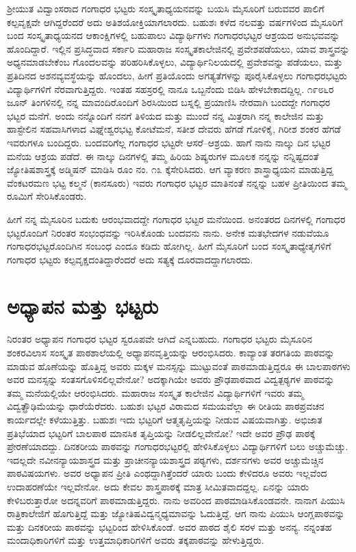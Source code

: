 {ಶ್ರೀಯುತ ವಿದ್ವಾಂಸರಾದ ಗಂಗಾಧರ ಭಟ್ಟರು ಸಂಸ್ಕೃತಾಧ್ಯಯನವನ್ನು ಬಯಸಿ ಮೈಸೂರಿಗೆ ಬರುವವರ ಪಾಲಿಗೆ ಕಲ್ಪವೃಕ್ಷವೇ ಆಗಿದ್ದರೆಂದರೆ ಅದು ಅತಿಶಯೋಕ್ತಿಯಾಗಲಾರದು. ಬಹುಶಃ ಕಳೆದ ನಲವತ್ತು ವರ್ಷಗಳಿಂದ ಮೈಸೂರಿಗೆ ಬಂದ ಸಂಸ್ಕೃತಾಧ್ಯಯನದ ಆಕಾಂಕ್ಷಿಗಳಲ್ಲಿ ಬಹುಪಾಲು ವಿದ್ಯಾರ್ಥಿಗಳು ಗಂಗಾಧರಭಟ್ಟರ ಆಶ್ರಯದ ಅನುಭವವನ್ನು ಹೊಂದಿದ್ದಾರೆ. ಇಲ್ಲಿನ ಪ್ರಸಿದ್ಧವಾದ ಸರ್ಕಾರಿ ಮಹಾರಾಜ ಸಂಸ್ಕೃತಕಾಲೇಜಿನಲ್ಲಿ ಪ್ರವೇಶಪಡೆಯಲು, ಯಾವ ಶಾಸ್ತ್ರವನ್ನು ಅಧ್ಯನಮಾಡಬೇಕೆಂಬ ಗೊಂದಲವನ್ನು ಪರಿಹರಿಸಿಕೊಳ್ಳಲು, ವಿದ್ಯಾರ್ಥಿನಿಲಯದಲ್ಲಿ ಪ್ರವೇಶವನ್ನು ಪಡೆಯಲು, ಮತ್ತು ಪ್ರತಿದಿನದ ಅಶನವ್ಯವಸ್ಥೆಯನ್ನು ಹೊಂದಲು, ಹೀಗೆ ಪ್ರತಿಯೊಂದು ಅಗತ್ಯತೆಗಳನ್ನು ಪೂರೈಸಿಕೊಳ್ಳಲು ಗಂಗಾಧರಭಟ್ಟರು ವಿದ್ಯಾರ್ಥಿಗಳಿಗೆ ನೆರವಾಗುತ್ತಿದ್ದರು. ಇಂತಹ ಸಹಸ್ರರಲ್ಲಿ ನಾನೂ ಒಬ್ಬನೆಂದು ಬಿಡಿಸಿ ಹೇಳಬೇಕಾದದ್ದಿಲ್ಲ. ೧೯೮೬ರ ಜೂನ್ ತಿಂಗಳಿನಲ್ಲಿ ನನ್ನ ಮಾವಂದಿರೊಂದಿಗೆ ಶಿರಸಿಯಿಂದ ಬಸ್ನಲ್ಲಿ ಪ್ರಯಾಣಿಸಿ ನೇರವಾಗಿ ಬಂದದ್ದೇ ಗಂಗಾಧರ ಭಟ್ಟರ ಮನೆಗೆ. ಅಂದು ನನ್ನೊಂದಿಗೆ ನನಗೆ ತಿಳಿಯದ ಮತ್ತು ಮುಂದೆ ನನ್ನ ಮಿತ್ರರಾಗಿ ನನ್ನ ಕಾಲೇಜಿನ ಮತ್ತು ಹಾಸ್ಟೇಲಿನ ಸಹವಾಸಿಗಳಾದ ವಿಘ್ನೇಶ್ವರಭಟ್ಟ ಕೋಟೆಮನೆ, ಸತೀಶ ದೇವರು ಹೆಗಡೆ ಗೋಳಿಕೈ, ಗಿರೀಶ ಶಂಕರ ಹೆಗಡೆ ಇವರುಗಳೂ ಬಂದಿದ್ದರು. ಬಂದವರಿಗೆಲ್ಲ ಗಂಗಾಧರ ಭಟ್ಟರೇ ಆಸರೆ–ಆಶ್ರಯ. ಹಾಗೆ ನಾನು ನಾಲ್ಕು ದಿನ ಭಟ್ಟರ ಮನೆಯ ಆಶ್ರಯ ಪಡೆದೆ. ಈ ನಾಲ್ಕು ದಿನಗಳಲ್ಲಿ ತಮ್ಮ ಹಿರಿಯ ಶಿಷ್ಯರುಗಳ ಮೂಲಕ ನನ್ನನ್ನು ನನ್ನಿಷ್ಟದಂತೆ ಜ್ಯೋತಿಷಶಾಸ್ತ್ರಕ್ಕೆ ಅಡ್ಮಿಷನ್ ಮಾಡಿಸಿ ರೂಂ ನಂ. ೧೩ ಕ್ಕೆಸೇರಿಸಿದರು. ಆಗ ವ್ಯಾಕರಣ ಶಾಸ್ತ್ರಾಧ್ಯಯನ ಮಾಡುತ್ತಿದ್ದ ವೆಂಕಟರಮಣ ಭಟ್ಟ ಕಲ್ಮನೆ (ಕಾನಸೂರು) ಇವರು ಗಂಗಾಧರ ಭಟ್ಟರ ಮಾತಿನಂತೆ ನನ್ನನ್ನು ಬಹಳ ಪ್ರೀತಿಯಿಂದ ತಮ್ಮ ರೂಮಿಗೆ ಸೇರಿಸಿಕೊಂಡರು. 

ಹೀಗೆ ನನ್ನ ಮೈಸೂರಿನ ಬದುಕು ಆರಂಭವಾದದ್ದೇ ಗಂಗಾಧರ ಭಟ್ಟರ ಮನೆಯಿಂದ. ಅನಂತರದ ದಿನಗಳಲ್ಲಿ ಗಂಗಾಧರ ಭಟ್ಟರೊಂದಿಗೆ ನಿರಂತರ ಸಂಭಂಧವನ್ನು ಇರಿಸಿಕೊಂಡು ಬಂದವನು ನಾನು. ಅನೇಕ ಮತಭೇದಗಳ ನಡುವೆಯೂ ಗಂಗಾಧರಭಟ್ಟರೊಂದಿಗಿನ ಸಂಬಂಧ ಎಂದೂ ಕಡಿದು ಹೋಗಿಲ್ಲ. ಹೀಗೆ ಮೈಸೂರಿಗೆ ಬಂದ ಸಂಸ್ಕೃತಾಧ್ಯೇತೃಗಳಿಗೆ ಗಂಗಾಧರ ಭಟ್ಟರು ಕಲ್ಪವೃಕ್ಷದಂತಿದ್ದಾರೆಂದರೆ ಅದು ಸತ್ಯಕ್ಕೆ ದೂರವಾದದ್ದಾಗಲಾರದು.

\section*{ಅಧ್ಯಾಪನ ಮತ್ತು ಭಟ್ಟರು}

ನಿರಂತರ ಅಧ್ಯಾಪನ ಗಂಗಾಧರ ಭಟ್ಟರ ಸ್ವರೂಪವೇ ಆಗಿದೆ ಎನ್ನಬಹುದು. ಗಂಗಾಧರ ಭಟ್ಟರು ಮೈಸೂರಿನ ಶಂಕರವಿಲಾಸ ಸಂಸ್ಕೃತ ಪಾಠಶಾಲೆಯಲ್ಲಿ ಅಧ್ಯಾಪನವೃತ್ತಿಯನ್ನು ಆರಂಭಿಸಿದರು. ಕಾವ್ಯಾಂತ ತರಗತಿಯ ಪಾಠವನ್ನು ಮಾಡುವ ಹೊಣೆಯನ್ನು ಹೊತ್ತಿದ್ದ ಅವರು ಮಕ್ಕಳ ಮನಸ್ಸನ್ನು ಮುಟ್ಟುವಂತೆ ಪಾಠಮಾಡುತ್ತಿದ್ದರೂ ಈ ಬಾಲಪಾಠಗಳು ಅವರ ಮನಸ್ಸನ್ನು ಸಂತಸಗೊಳಿಸಲಿಲ್ಲವೇನೋ? ಅದಕ್ಕಾಗಿಯೇ ಅವರು ಪ್ರೌಢಪಾಠವಾದ ವಿದ್ವತ್ಪಠ್ಯಗಳ ಪಾಠವನ್ನು ತಮ್ಮ ಮನೆಯಲ್ಲಿಯೇ ಆರಂಭಿಸಿದರು. ಮಹಾರಾಜ ಸಂಸ್ಕೃತ ಕಾಲೇಜಿನ ವಿದ್ಯಾರ್ಥಿಗಳಿಗೆ ಇವರು ತಮ್ಮ ವಿದ್ವತ್ಪ್ರೌಢಿಮೆಯನ್ನು ಧಾರೆಯೆರೆದರು. ಬಹುಶಃ ಭಟ್ಟರ ವಿರಾಮದ ಸಮಯವೆಲ್ಲಾ ಈ ರೀತಿಯ ಪಾಠಪ್ರವಚನ ಕಾರ್ಯದಲ್ಲೇ ಕಳೆಯುತ್ತಿತ್ತು. ಬಹುಶಃ ಇದು ಭಟ್ಟರಿಗೆ ಆತ್ಮತೃಪ್ತಿಯನ್ನು ನೀಡುವ ವಿಷಯವಾಗಿತ್ತು. ಅಭಿಜಾತ ಪ್ರತಿಭೆಯಾದ ಭಟ್ಟರಿಗೆ ಬಾಲಪಾಠ ಮಾನಸಿಕ ತೃಪ್ತಿಯನ್ನು ನೀಡಲಿಲ್ಲವೇನೋ? ಇದೇ ಅವರ ಪ್ರೌಢ ಪಾಠಕ್ಕೆ ಪ್ರೇರಣೆಯಾದದ್ದು. ದಿನಕರೀಯ ಪಾಠವನ್ನು ಗಂಗಾಧರಭಟ್ಟರಲ್ಲಿ ಹೇಳಿಸಿಕೊಳ್ಳಲು ವಿದ್ಯಾರ್ಥಿಗಳಿಗೆ ಬಲು ಅಚ್ಚುಮೆಚ್ಚು. ಇದಲ್ಲದೇ ನವೀನನ್ಯಾಯಶಾಸ್ತ್ರದ ಮತ್ತು ಪ್ರಾಚೀನನ್ಯಾಯಶಾಸ್ತ್ರದ ಪಠ್ಯಗಳು, ದರ್ಶನಗಳು ಅವರ ಅಚ್ಚುಮೆಚ್ಚಿನ ಪಾಠವಿಷಯಗಳು. ಅವರ ಅಧ್ಯಾಪನ ಪ್ರೀತಿ ಎಂಥದ್ದಾಗಿತ್ತೆಂದರೆ ಯಾರು ಬಂದು ಕೇಳಿದರೂ ಅವರು ಇಲ್ಲವೆಂದ ಉದಾಹರಣೆಯೇ ಇಲ್ಲವೇನೋ. ಅದು ಕೇವಲ ಶಾಸ್ತ್ರಪಾಠಕ್ಕೆ ಮಾತ್ರ ಸೀಮಿತವಾದದ್ದಲ್ಲ. ಏನನ್ನು ಯಾರು ಕೇಳಿಬರುತ್ತಾರೋ ಅದನ್ನವರಿಗೆ ಪಾಠಮಾಡುತ್ತಿದ್ದರು. ನಾನು ಅವರಿಂದ ಪಾಠಮಾಡಿಸಿಕೊಂಡವನೇ. ನಾನಾಗ ಪಿಯುಸಿ ರಾತ್ರಿಕಾಲೇಜಿಗೆ ಹೊಗುತ್ತಿದ್ದೆ ಮತ್ತು ಜ್ಯೋತಿಷವಿದ್ವನ್ಮಧ್ಯಮಾವನ್ನು ಓದುತ್ತಿದ್ದೆ. ಆಗ ನಾನು ಪಿಯುಸಿ ಆಂಗ್ಲಪಾಠವನ್ನು ಮತ್ತು ದಿನಕರೀಯ ಪಾಠವನ್ನು ಭಟ್ಟರಿಂದ ಹೇಳಿಸಿಕೊಂಡೆ. ಅವರ ಪಾಠದ ಶೈಲಿ ಸರಳ ಮತ್ತು ಅನನ್ಯ. ನನ್ನಂತಹ ಮಂದಾಧಿಕಾರಿಗಳಿಗೆ ಮತ್ತು ಉತ್ತಮಾಧಿಕಾರಿಗಳಿಗೆ ಅವರು ತಕ್ಕಪಾಠವನ್ನು ಹೇಳುತ್ತಿದ್ದರು.

}

